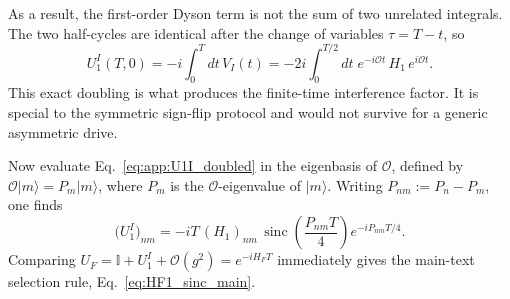 \documentclass[aps,prb,reprint,twocolumn,amsmath,amssymb,citeautoscript]{revtex4-2}
\begin{document}
As a result, the first-order Dyson term is not the sum of two unrelated
integrals. The two half-cycles are identical after the change of
variables $\tau=T-t$, so
\begin{equation}
U_1^I(T,0)
=
-i\int_0^T dt\,V_I(t)
=
-2i\int_0^{T/2} dt\;
e^{-i\mathcal{O}t}\,H_1\,e^{i\mathcal{O}t}.
\label{eq:app:U1I_doubled}
\end{equation}
This exact doubling is what produces the finite-time interference factor.
It is special to the symmetric sign-flip protocol and would not survive
for a generic asymmetric drive.

Now evaluate Eq.~\eqref{eq:app:U1I_doubled} in the eigenbasis of
$\mathcal{O}$, defined by $\mathcal{O}|m\rangle=P_m|m\rangle$, where
$P_m$ is the $\mathcal{O}$-eigenvalue of $|m\rangle$. Writing
$P_{nm}:=P_n-P_m$, one finds
\begin{equation}
\bigl(U_1^I\bigr)_{nm}
=
-iT\,(H_1)_{nm}\,
\operatorname{sinc}\!\left(\frac{P_{nm}T}{4}\right)
e^{-iP_{nm}T/4}.
\label{eq:app:U1I_sinc}
\end{equation}
Comparing
$U_F=\mathbb{I}+U_1^I+\mathcal{O}(g^2)=e^{-iH_FT}$
immediately gives the main-text selection rule,
Eq.~\eqref{eq:HF1_sinc_main}.
\end{document}
